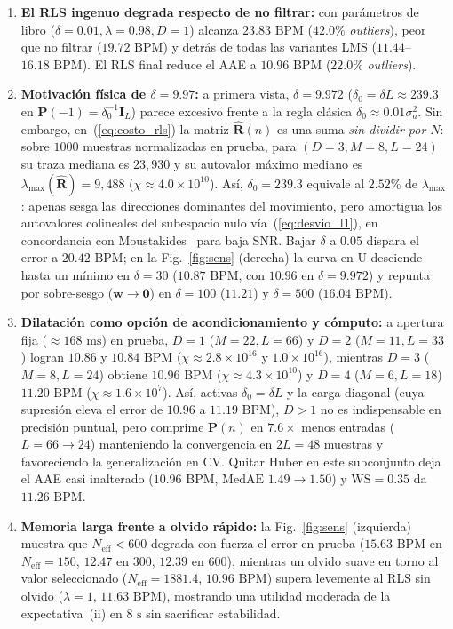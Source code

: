 \documentclass[conference]{IEEEtran}
\begin{document}
\begin{enumerate}
    \item \textbf{El RLS ingenuo degrada respecto de no filtrar:} con parámetros de libro ($\delta=0.01,\lambda=0.98,D=1$) alcanza $23.83\text{ BPM}$ ($42.0\%$ \textit{outliers}), peor que no filtrar ($19.72\text{ BPM}$) y detrás de todas las variantes LMS ($11.44$--$16.18\text{ BPM}$). El RLS final reduce el AAE a $10.96\text{ BPM}$ ($22.0\%$ \textit{outliers}).
    \item \textbf{Motivación física de $\delta=9.97$:} a primera vista, $\delta=9.972$ ($\delta_0=\delta L\approx 239.3$ en $\mathbf{P}(-1)=\delta_0^{-1}\mathbf{I}_L$) parece excesivo frente a la regla clásica $\delta_0\approx 0.01\sigma_a^2$. Sin embargo, en~(\ref{eq:costo_rls}) la matriz $\hat{\mathbf{R}}(n)$ es una suma \emph{sin dividir por $N$}: sobre $1000$ muestras normalizadas en prueba, para $(D=3,M=8,L=24)$ su traza mediana es $23{,}930$ y su autovalor máximo mediano es $\lambda_{\max}(\hat{\mathbf{R}})=9{,}488$ ($\chi\approx 4.0\times 10^{10}$). Así, $\delta_0=239.3$ equivale al $2.52\%$ de $\lambda_{\max}$: apenas sesga las direcciones dominantes del movimiento, pero amortigua los autovalores colineales del subespacio nulo vía~(\ref{eq:desvio_l1}), en concordancia con Moustakides~\cite{moustakides1997rls} para baja SNR. Bajar $\delta$ a $0.05$ dispara el error a $20.42\text{ BPM}$; en la Fig.~\ref{fig:sens} (derecha) la curva en U desciende hasta un mínimo en $\delta=30$ ($10.87\text{ BPM}$, con $10.96$ en $\delta=9.972$) y repunta por sobre-sesgo ($\mathbf{w}\to\mathbf{0}$) en $\delta=100$ ($11.21$) y $\delta=500$ ($16.04\text{ BPM}$).
    \item \textbf{Dilatación como opción de acondicionamiento y cómputo:} a apertura fija ($\approx 168\text{ ms}$) en prueba, $D=1$ ($M=22,L=66$) y $D=2$ ($M=11,L=33$) logran $10.86$ y $10.84\text{ BPM}$ ($\chi\approx 2.8\times 10^{16}$ y $1.0\times 10^{16}$), mientras $D=3$ ($M=8,L=24$) obtiene $10.96\text{ BPM}$ ($\chi\approx 4.3\times 10^{10}$) y $D=4$ ($M=6,L=18$) $11.20\text{ BPM}$ ($\chi\approx 1.6\times 10^{7}$). Así, activas $\delta_0=\delta L$ y la carga diagonal (cuya supresión eleva el error de $10.96$ a $11.19\text{ BPM}$), $D>1$ no es indispensable en precisión puntual, pero comprime $\mathbf{P}(n)$ en $7.6\times$ menos entradas ($L=66\to 24$) manteniendo la convergencia en $2L=48$ muestras y favoreciendo la generalización en CV. Quitar Huber en este subconjunto deja el AAE casi inalterado ($10.96\text{ BPM}$, $\text{MedAE } 1.49\to 1.50$) y $\text{WS}=0.35$ da $11.26\text{ BPM}$.
    \item \textbf{Memoria larga frente a olvido rápido:} la Fig.~\ref{fig:sens} (izquierda) muestra que $N_{\text{eff}}<600$ degrada con fuerza el error en prueba ($15.63\text{ BPM}$ en $N_{\text{eff}}=150$, $12.47$ en $300$, $12.39$ en $600$), mientras un olvido suave en torno al valor seleccionado ($N_{\text{eff}}=1881.4$, $10.96\text{ BPM}$) supera levemente al RLS sin olvido ($\lambda=1$, $11.63\text{ BPM}$), mostrando una utilidad moderada de la expectativa~(ii) en $8\text{ s}$ sin sacrificar estabilidad.
\end{enumerate}
\end{document}
